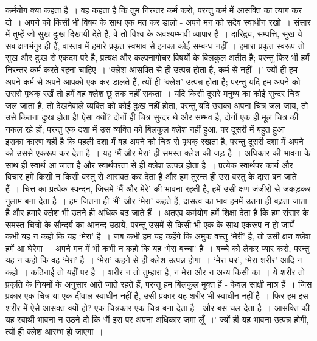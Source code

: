 कर्मयोग क्या कहता है~। वह कहता है कि तुम निरन्तर कर्म करो, परन्तु कर्म में आसक्ति का त्याग कर दो~। अपने को किसी भी विषय के साथ एक मत कर डालो - अपने मन को सदैव स्वाधीन रखो~। संसार में तुम्हें जो सुख-दुःख दिखायी देते हैं, वे तो विश्व के अवश्यम्भावी व्यापार हैं~। दारिद्र्य, सम्पत्ति, सुख ये सब क्षणभंगुर ही हैं, वास्तव में हमारे प्रकृत स्वभाव से इनका कोई सम्बन्ध नहीं~। हमारा प्रकृत स्वरूप तो सुख और दुःख से एकदम परे है, प्रत्यक्ष और कल्पनागोचर विषयों के बिलकुल अतीत है; परन्तु फिर भी हमें निरन्तर कर्म करते रहना चाहिए~। ‘क्लेश आसक्ति से ही उत्पन्न होता है, कर्म से नहीं~।’ ज्यों ही हम अपने कर्म से अपने-आपको एक कर डालते हैं, त्यों ही ‘क्लेश’ उत्पन्न होता है; परन्तु यदि हम अपने को उससे पृथक् रखें तो हमें वह क्लेश छू तक नहीं सकता~। यदि किसी दूसरे मनुष्य का कोई सुन्दर चित्र जल जाता है, तो देखनेवाले व्यक्ति को कोई दुःख नहीं होता, परन्तु यदि उसका अपना चित्र जल जाय, तो उसे कितना दुःख होता है! ऐसा क्यों? दोनों ही चित्र सुन्दर थे और सम्भव है, दोनों एक ही मूल चित्र की नकल रहे हों; परन्तु एक दशा में उस व्यक्ति को बिलकुल क्लेश नहीं हुआ, पर दूसरी में बहुत हुआ~। इसका कारण यही है कि पहली दशा में वह अपने को चित्र से पृथक् रखता है, परन्तु दूसरी दशा में अपने को उससे एकरूप कर देता है~। यह ‘मैं और मेरा’ ही समस्त क्लेश की जड़ है~। अधिकार की भावना के साथ ही स्वार्थ आ जाता है और स्वार्थपरता से ही क्लेश उत्पन्न होता है~। प्रत्येक स्वार्थपर कार्य और विचार हमें किसी न किसी वस्तु से आसक्त कर देता है और हम तुरन्त ही उस वस्तु के दास बन जाते हैं~। चित्त का प्रत्येक स्पन्दन, जिसमें ‘मैं और मेरे’ की भावना रहती है, हमें उसी क्षण जंजीरों से जकड़कर गुलाम बना देता है~। हम जितना ही ‘मैं’ और ‘मेरा’ कहते हैं, दासत्व का भाव हममें उतना ही बढ़ता जाता है और हमारे क्लेश भी उतने ही अधिक बढ़ जाते हैं~। अतएव कर्मयोग हमें शिक्षा देता है कि हम संसार के समस्त चित्रों के सौन्दर्य का आनन्द उठायें, परन्तु उसमें से किसी भी एक के साथ एकरूप न हो जायँ~। कभी यह न कहो कि यह ‘मेरा’ है~। जब कभी हम यह कहेंगे कि अमुक वस्तु ‘मेरी’ है, तो उसी क्षण क्लेश हमें आ घेरेगा~। अपने मन में भी कभी न कहो कि यह ‘मेरा बच्चा’ है~। बच्चे को लेकर प्यार करो, परन्तु यह न कहो कि वह ‘मेरा’ है~। ‘मेरा’ कहने से ही क्लेश उत्पन्न होगा~। ‘मेरा घर’, ‘मेरा शरीर’ आदि न कहो~। कठिनाई तो यहीं पर है~। शरीर न तो तुम्हारा है, न मेरा और न अन्य किसी का~। ये शरीर तो प्रकृति के नियमों के अनुसार आते जाते रहते हैं, परन्तु हम बिलकुल मुक्त हैं - केवल साक्षी मात्र हैं~। जिस प्रकार एक चित्र या एक दीवाल स्वाधीन नहीं है, उसी प्रकार यह शरीर भी स्वाधीन नहीं है~। फिर हम इस शरीर में ऐसे आसक्त क्यों हो? एक चित्रकार एक चित्र बना देता है - और बस चल देता है~। आसक्ति की यह स्वार्थी भावना न उठने दो कि ‘मैं इस पर अपना अधिकार जमा लूँ~।’ ज्यों ही यह भावना उत्पन्न होगी, त्यों ही क्लेश आरम्भ हो जाएगा~।

